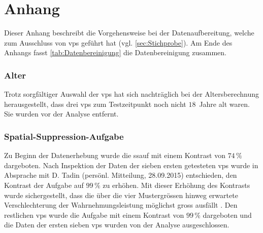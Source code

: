 \documentclass[11pt, twoside, a4paper]{book}		%
\begin{document}

\appendix
\setcounter{figure}{0}
\renewcommand\thefigure{\Alph{appndx}\@arabic\c@figure}

\chapter[Anhang: Datenaufbereitung]{Anhang \label{cha:Anhang_A}}

\setcounter{table}{0}
\renewcommand{\thetable}{A\arabic{table}}

Dieser Anhang beschreibt die Vorgehensweise bei der Datenaufbereitung, welche zum Ausschluss von \glspl{vp} geführt hat (vgl. \autoref{sec:Stichprobe}). Am Ende des Anhangs fasst \autoref{tab:Datenbereinigung} die Datenbereinigung zusammen.

\subsection*{Alter}
Trotz sorgfältiger Auswahl der \glspl{vp} hat sich nachträglich bei der Altersberechnung herausgestellt, dass drei \glspl{vp} zum Testzeitpunkt noch nicht $18$~Jahre alt waren. Sie wurden vor der Analyse entfernt.

\subsection*{Spatial-Suppression-Aufgabe}
Zu Beginn der Datenerhebung wurde die \gls{ssauf} mit einem Kontrast von $74\,\%$ dargeboten. Nach Inspektion der Daten der sieben ersten getesteten \glspl{vp} wurde in Absprache mit D. Tadin (persönl. Mitteilung, 28.09.2015) entschieden, den Kontrast der Aufgabe auf $99\,\%$ zu erhöhen. Mit dieser Erhöhung des Kontrasts wurde sichergestellt, dass die über die vier Mustergrössen hinweg erwartete Verschlechterung der Wahrnehmungsleistung möglichst gross ausfällt \citep[für den Zusammenhang zwischen Kontrast und Wahrnehmungsleistung siehe][]{Tadin2003}. Den restlichen \glspl{vp} wurde die Aufgabe mit einem Kontrast von $99\,\%$ dargeboten und die Daten der ersten sieben \glspl{vp} wurden von der Analyse ausgeschlossen.
\end{document}
